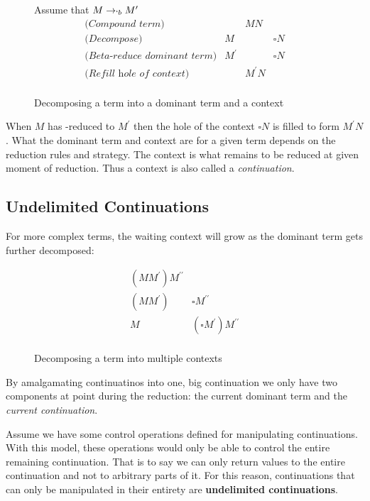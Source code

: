   \begin{figure}[!h]
    \hspace{1cm}Assume that $M \rightarrow_{`b} M^\prime$
    \[
    \begin{array}{lrcl}
    \textit{(Compound term)}&& MN \\
    \textit{(Decompose)}&M && \square N \\
    \textit{(Beta-reduce dominant term)}& M^\prime && \square N \\
    \textit{(Refill hole of context)}&& M^\prime N \\
    \end{array}
    \]
  \caption{Decomposing a term into a dominant term and a context}
  \end{figure}
  
  When $M$ has \bta-reduced to $M^\prime$ then the hole of the context
  $\square N$ is filled to form $M^\prime N$. What the dominant term and
  context are for a given term depends on the reduction rules and strategy. 
  The context is what remains to be reduced at given moment of reduction.
  Thus a context is also called a \emph{continuation}.
 
  \subsection{Undelimited Continuations} 
 
  For more complex terms, the waiting context will grow as the dominant
  term gets further decomposed:
  
  \begin{figure}[!h]
    \[
    \begin{array}{ll}
      (MM^\prime) M^{\prime\prime} \\
      (MM^\prime) & \square M^{\prime\prime} \\
      M & (\square M^\prime) M^{\prime\prime} \\
    \end{array}
    \]
  \caption{Decomposing a term into multiple contexts}
  \end{figure}

  By amalgamating continuatinos into one, big continuation we only have
  two components at point during the reduction: the current dominant term
  and the \emph{current continuation}. 
  
  Assume we have some control operations defined for manipulating
  continuations. With this model, these operations would only be able to 
  control the entire remaining continuation. That is to say we can only 
  return values to the entire continuation and not to arbitrary parts of 
  it. For this reason, continuations that can only be manipulated in their 
  entirety are \textbf{undelimited continuations}.

